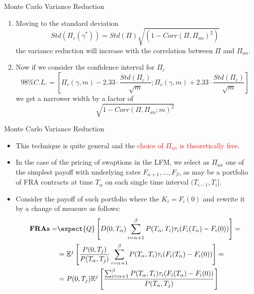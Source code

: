 \documentclass{beamer}
\begin{document}
\begin{frame}{Monte Carlo Variance Reduction}
	\begin{enumerate}\addtocounter{enumi}{3}
  \item<1-> Moving to the standard deviation
	\begin{equation*}
		Std(\Pi_c(\gamma^*)) = Std(\Pi) \sqrt{(1 - Corr(\Pi, \Pi_{an})^2)}
	\end{equation*}
	the variance reduction will increase with the correlation between $\Pi$ and $\Pi_{an}$. 
	\item<2-> Now if we consider the confidence interval for $\Pi_c$ 
	\begin{equation*}
		98\% C.L. =\left[\Pi_c(\gamma,m) - 2.33\cdot\frac{Std(\Pi_c)}{\sqrt{m}};\Pi_c(\gamma,m) + 2.33\cdot\frac{Std(\Pi_c)}{\sqrt{m}}\right] 
	\end{equation*}
	we get a narrower width by a factor of
	\begin{equation*}
		\sqrt{1 - Corr(\Pi, \Pi_{an}; m)^2}
	\end{equation*}
	\end{enumerate}
\end{frame}

\begin{frame}{Monte Carlo Variance Reduction}
  \begin{itemize}
  \item<1-> This technique is quite general and the \textcolor{red}{choice of $\Pi_{an}$ is theoretically free}.
  \item<2-> In the case of the pricing of swaptions in the LFM, we select as $\Pi_{an}$ one of the simplest payoff with underlying rates $F_{\alpha+1},\ldots,F_\beta$, as may be a portfolio of FRA contracts at time $T_\alpha$ on each single time interval $(T_{i-1}, T_i]$.
  \item<3-> Consider the payoff of such portfolio where the $K_i = F_i(0)$ and rewrite it by a change of measure as follows:
    \begin{equation*}
      \begin{aligned}
        \textbf{FRAs} = &\expect{Q}\left[D(0,T_\alpha)\sum_{i=\alpha+1}^\beta P(T_\alpha,T_i)\tau_i(F_i(T_\alpha) - F_i(0))\right] = \\
        &=\mathbb{E}^j\left[\frac{P(0,T_j)}{P(T_\alpha,T_j)}\sum_{i=\alpha+1}^\beta P(T_\alpha,T_i)\tau_i(F_i(T_\alpha) - F_i(0))\right] = \\
        & = P(0,T_j)\mathbb{E}^j\left[\frac{\sum_{i=\alpha+1}^\beta P(T_\alpha,T_i)\tau_i(F_i(T_\alpha) - F_i(0))}{P(T_\alpha,T_j)}\right]
      \end{aligned}
    \end{equation*}
  \end{itemize}
\end{frame}
\end{document}

